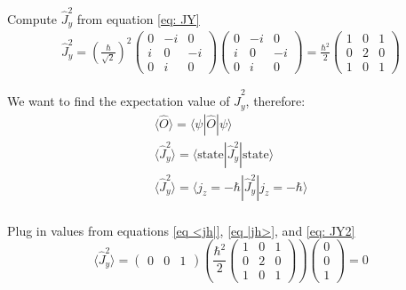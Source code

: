 \documentclass[12pt]{article}
\begin{document}
        Compute $\hat{J}_y^2$ from equation \ref{eq: JY}
        \begin{equation} \label{eq: JY2}
            \begin{split}
                \hat{J}_y^2 = \left( \frac{\hbar}{\sqrt{2}} \right)^2 \begin{pmatrix}
                    0 & -i & 0 \\
                    i & 0 & -i \\
                    0 & i & 0
                \end{pmatrix} \begin{pmatrix}
                    0 & -i & 0 \\
                    i & 0 & -i \\
                    0 & i & 0
                \end{pmatrix} = \frac{\hbar^2}{2} \begin{pmatrix}
                    1 & 0 & 1 \\
                    0 & 2 & 0 \\
                    1 & 0 & 1
                \end{pmatrix}
                \end{split}
        \end{equation}

        We want to find the expectation value of $\hat{J}_y^2$, therefore:
        \begin{align*}
            \langle \hat{O} \rangle = \langle \psi | \hat{O} | \psi \rangle \\
            \langle \hat{J}_y^2 \rangle = \langle \text{state} | \hat{J}_y^2 | \text{state} \rangle \\
            \langle \hat{J}_y^2 \rangle = \langle j_z = - \hbar | \hat{J}_y^2 | j_z = -\hbar \rangle \\
        \end{align*}

        Plug in values from equations \ref{eq <jh|}, \ref{eq |jh>}, and \ref{eq: JY2}
        \[
            \langle \hat{J}_y^2 \rangle = \begin{pmatrix}
                0 & 0 & 1
            \end{pmatrix} \left( \frac{\hbar^2}{2} \begin{pmatrix}
                1 & 0 & 1 \\
                0 & 2 & 0 \\
                1 & 0 & 1
            \end{pmatrix} \right) \begin{pmatrix}
                0 \\ 0 \\ 1
            \end{pmatrix} = 0
        \]
\end{document}
